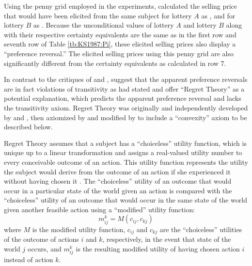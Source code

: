 \documentclass[../main.tex]{subfiles}
\begin{document}
Using the penny grid employed in the \textcite{Grether1979} experiments, \textcite[680]{Karni1987} calculated the selling price that would have been elicited from the same subject for lottery $A$ as , and for lottery $B$ as .
Because the unconditional values of lottery $A$ and lottery $B$ along with their respective certainty equivalents are the same as in the first row and seventh row of Table \ref{tb:KS1987:Pi}, these elicited selling prices also display a \enquote{preference reversal.}
The elicited selling prices using this penny grid are also significantly different from the certainty equivalents as calculated in row 7.

In contrast to the critiques of \textcite{Holt1986} and \textcite{Karni1987}, \textcite{Loomes1989} suggest that the apparent preference reversals are in fact violations of transitivity as \textcite[623]{Grether1979} had stated and offer \enquote{Regret Theory} as a potential explanation, which predicts the apparent preference reversal and lacks the transitivity axiom.
Regret Theory was originally and independently developed by \textcite{Loomes1982} and \textcite{Bell1982}, then axiomized by \textcite{Fishburn1987} and modified by \textcite{Loomes1987} to include a \enquote{convexity} axiom to be described below.

Regret Theory assumes that a subject has a \enquote{choiceless} utility function, which is unique up to a linear transformation and assigns a real-valued utility number to every conceivable outcome of an action.
This utility function represents the utility the subject would derive from the outcome of an action if she experienced it without having chosen it \parencite[807]{Loomes1987}.
The \enquote{choiceless} utility of an outcome that would occur in a particular state of the world given an action is compared with the \enquote{choiceless} utility of an outcome that would occur in the same state of the world given another feasible action using a \enquote{modified} utility function:
\begin{equation}
	\label{eq:LS1987:mu}
	m^k_{ij} = M( c_{ij} , c_{kj} )
\end{equation}
\noindent where $M$ is the modified utility function, $c_{ij}$ and $c_{kj}$ are the \enquote{choiceless} utilities of the outcome of actions $i$ and $k$, respectively, in the event that state of the world $j$ occurs, and $m^k_{ij}$ is the resulting modified utility of having chosen action $i$ instead of action $k$.
\end{document}
